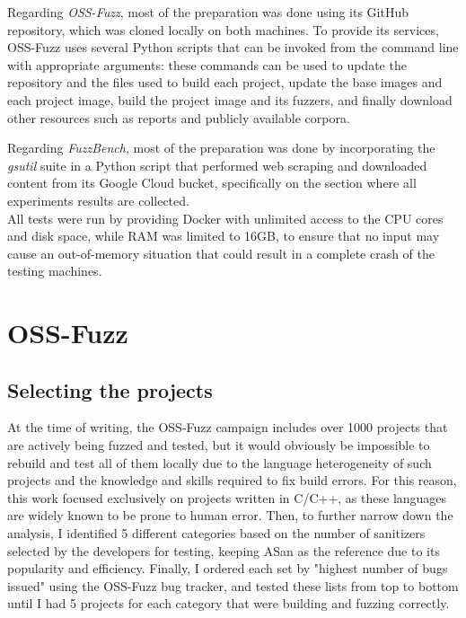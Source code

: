 Regarding \textit{OSS-Fuzz}, most of the preparation was done using its GitHub repository, which was cloned locally on both machines. To provide its services, OSS-Fuzz uses several Python scripts that can be invoked from the command line with appropriate arguments: these commands can be used to update the repository and the files used to build each project, update the base images and each project image, build the project image and its fuzzers, and finally download other resources such as reports and publicly available corpora. 

Regarding \textit{FuzzBench}, most of the preparation was done by incorporating the \textit{gsutil} suite in a Python script that performed web scraping and downloaded content from its Google Cloud bucket, specifically on the section where all experiments results are collected.
\ \\

All tests were run by providing Docker with unlimited access to the CPU cores and disk space, while RAM was limited to 16GB, to ensure that no input may cause an out-of-memory situation that could result in a complete crash of the testing machines. 


\newpage
\section{OSS-Fuzz}
\subsection{Selecting the projects} \label{selection}
At the time of writing, the OSS-Fuzz campaign includes over 1000 projects that are actively being fuzzed and tested, but it would obviously be impossible to rebuild and test all of them locally due to the language heterogeneity of such projects and the knowledge and skills required to fix build errors. For this reason, this work focused exclusively on projects written in C/C++, as these languages are widely known to be prone to human error. Then, to further narrow down the analysis, I identified 5 different categories based on the number of sanitizers selected by the developers for testing, keeping ASan as the reference due to its popularity and efficiency. Finally, I ordered each set by "highest number of bugs issued" using the OSS-Fuzz bug tracker, and tested these lists from top to bottom until I had 5 projects for each category that were building and fuzzing correctly.

